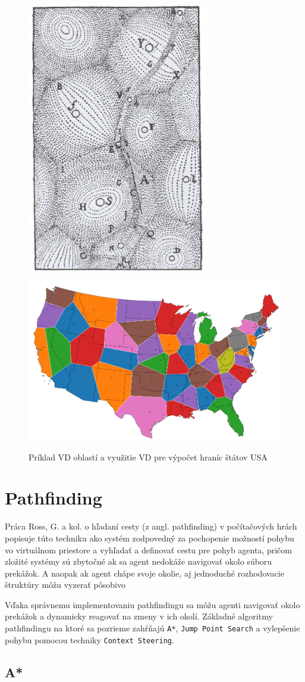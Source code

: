 \begin{figure}[H]
    \centering
    \includegraphics[width=0.22\linewidth]{obrazky-figures/vd-example.png}
    \includegraphics[width=0.55\linewidth]{obrazky-figures/vd-us.png}
    \caption{Príklad VD oblastí \cite{aurenhammer2000voronoi} a využitie VD pre výpočet hraníc štátov USA\protect\footnotemark}
    \label{fig:vd}
\end{figure}


\section{Pathfinding}

Práca Ross, G. a kol. o hľadaní cesty (z angl. pathfinding) v počítačových hrách popisuje túto techniku ako systém zodpovedný za pochopenie možností pohybu vo virtuálnom priestore a vyhľadať a definovať cestu pre pohyb agenta, pričom zložité systémy sú zbytočné ak sa agent nedokáže navigovať okolo súboru prekážok. A naopak ak agent chápe svoje okolie, aj jednoduché rozhodovacie štruktúry môžu vyzerať pôsobivo \cite{graham2003pathfinding}

Vďaka správnemu implementovaniu pathfindingu sa môžu agenti navigovať okolo prekážok a dynamicky reagovať na zmeny v ich okolí. Základné algoritmy pathfindingu na ktoré sa pozrieme zahŕňajú \texttt{A*}, \texttt{Jump Point Search} a vylepšenie pohybu pomocou techniky \texttt{Context Steering}.

\subsection{A*}

